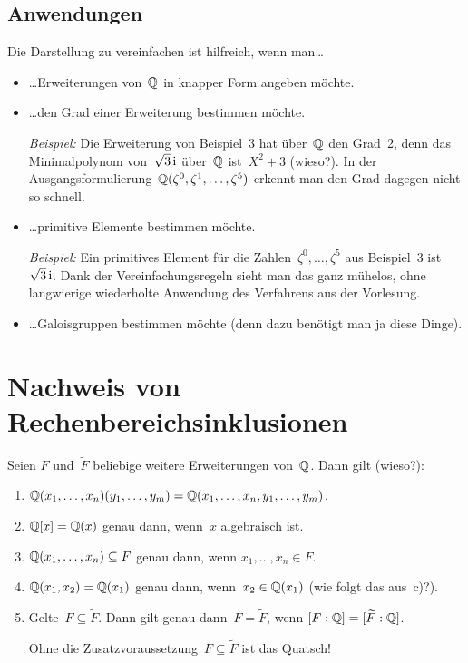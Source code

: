 \documentclass{../../algblatt}
\begin{document}
\subsection*{Anwendungen}

Die Darstellung zu vereinfachen ist hilfreich, wenn man\ldots
\begin{itemize}
\item \ldots Erweiterungen von~$\mathbb{Q}$ in knapper Form angeben möchte.

\item \ldots den Grad einer Erweiterung bestimmen
möchte.

\emph{Beispiel:} Die Erweiterung von Beispiel~3 hat über~$\mathbb{Q}$ den Grad~2, denn das
Minimalpolynom von~$\sqrt{3}\,\mathrm{i}$ über~$\mathbb{Q}$ ist~$X^2 + 3$ (wieso?). In der
Ausgangsformulierung~$\mathbb{Q}(\zeta^0,\zeta^1,\ldots,\zeta^5)$ erkennt man den Grad
dagegen nicht so schnell.

\item \ldots primitive Elemente bestimmen möchte.

\emph{Beispiel:} Ein primitives Element für die Zahlen~$\zeta^0,\ldots,\zeta^5$
aus Beispiel~3 ist~$\sqrt{3}\,\mathrm{i}$. Dank der Vereinfachungsregeln sieht man das ganz
mühelos, ohne langwierige wiederholte Anwendung des Verfahrens aus der
Vorlesung.

\item \ldots Galoisgruppen bestimmen möchte (denn dazu benötigt man ja diese
Dinge).
\end{itemize}


\section*{Nachweis von Rechenbereichsinklusionen}

Seien $F$ und~$\widetilde F$ beliebige weitere Erweiterungen von~$\mathbb{Q}$. Dann
gilt (wieso?):

\begin{enumerate}
\item $\mathbb{Q}(x_1,\ldots,x_n)(y_1,\ldots,y_m) = \mathbb{Q}(x_1,\ldots,x_n,y_1,\ldots,y_m)$.
\item $\mathbb{Q}[x] = \mathbb{Q}(x)$ genau dann, wenn~$x$ algebraisch ist.
\item $\mathbb{Q}(x_1,\ldots,x_n) \subseteq F$ genau dann, wenn
$x_1,\ldots,x_n \in F$.
\item $\mathbb{Q}(x_1,x_2) = \mathbb{Q}(x_1)$ genau dann, wenn~$x_2 \in \mathbb{Q}(x_1)$ (wie folgt
das aus~c)?).
\item Gelte~$F \subseteq \widetilde F$. Dann gilt genau dann~$F =
\widetilde F$, wenn $[F:\mathbb{Q}] = [\widetilde F:\mathbb{Q}]$.

Ohne die Zusatzvoraussetzung~$F \subseteq \widetilde F$ ist das Quatsch!
\end{enumerate}
\end{document}
